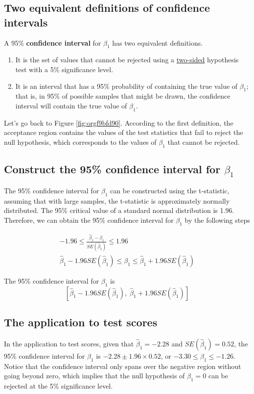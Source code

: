 \documentclass[a4paper,11pt]{article}
\begin{document}
\subsection{Two equivalent definitions of confidence intervals}
\label{sec:orga5b2cdc}
A 95\% \textbf{confidence interval} for \(\beta_1\) has two equivalent
definitions. 
\begin{enumerate}
\item It is the set of values that cannot be rejected using a \uline{two-sided}
hypothesis test with a 5\% significance level.
\item It is an interval that has a 95\% probability of containing the true
value of \(\beta_1\); that is, in 95\% of possible samples that might be
drawn, the confidence interval will contain the true value of
\(\beta_1\).
\end{enumerate}

Let's go back to Figure \ref{fig:orgf9bfd90}. According to the first
definition, the acceptance region contains the values of the
test statistics that fail to reject the null hypothesis,
which corresponds to the values of \(\beta_1\) that cannot be rejected. 

\subsection{Construct the 95\% confidence interval for \(\beta_1\)}
\label{sec:orgb7fb720}
The 95\% confidence interval for \(\beta_1\) can be constructed using the
t-statistic, assuming that with large samples, the t-statistic is
approximately normally distributed. The 95\% critical value of a
standard normal distribution is 1.96. Therefore, we can obtain the 95\%
confidence interval for \(\beta_1\) by the following steps
\begin{LaTeX}
\begin{gather*}
-1.96 \leq \frac{\hat{\beta}_1 - \beta_1}{SE(\hat{\beta}_1)} \leq 1.96 \\
\hat{\beta}_1 - 1.96 SE(\hat{\beta}_1) \leq \beta_1 \leq \hat{\beta}_1 + 1.96 SE(\hat{\beta}_1)
\end{gather*}
\end{LaTeX}

The 95\% confidence interval for \(\beta_1\) is 
\[ \left[ \hat{\beta}_1 - 1.96 SE(\hat{\beta}_1),\; \hat{\beta}_1 + 1.96
SE(\hat{\beta}_1) \right] \]

\subsection{The application to test scores}
\label{sec:org5f88049}
In the application to test scores, given that \(\hat{\beta}_1 = -2.28\)
and \(SE(\hat{\beta}_1) = 0.52\), the 95\% confidence interval for
\(\beta_1\) is \({-2.28 \pm 1.96 \times 0.52}\), or \(-3.30 \leq \beta_1
\leq -1.26\). Notice that the confidence interval only spans over the
negative region without going beyond zero, which implies that the null
hypothesis of \(\beta_1 = 0\) can be rejected at the 5\% significance
level. 
\end{document}
